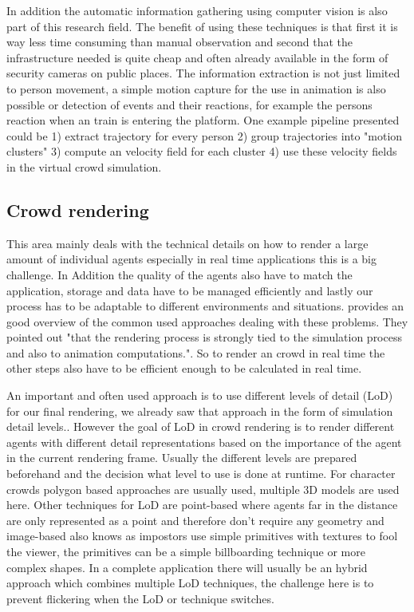 \documentclass{acmsiggraph}               %
\begin{document}
In addition the automatic information gathering using computer vision is also part of this research field. The benefit of using these techniques is that first it is way less time consuming than manual observation and second that the infrastructure needed is quite cheap and often already available in the form of security cameras on public places. The information extraction is not just limited to person movement, a simple motion capture for the use in animation is also possible or detection of events and their reactions, for example the persons reaction when an train is entering the platform. One example pipeline \cite{thalmann_crowd_2013} presented could be 1) extract trajectory for every person 2) group trajectories into "motion clusters" 3) compute an velocity field for each cluster 4) use these velocity fields in the virtual crowd simulation. 

\cite{thalmann_crowd_2013}

\subsection{Crowd rendering}

This area mainly deals with the technical details on how to render a large amount of individual agents especially in real time applications this is a big challenge. In Addition the quality of the agents also have to match the application, storage and data have to be managed  efficiently and lastly our process has to be adaptable to different environments and situations. 
\cite{beacco_survey_2016} provides an good overview of the common used approaches dealing with these problems. They pointed out "that the rendering process is strongly tied to the simulation process and also to animation computations.". So to render an crowd in real time the other steps also have to be efficient enough to be calculated in real time.  

An important and often used approach is to use different levels of detail (LoD) for our final rendering, we already saw that approach in the form of simulation detail levels.\cite{osullivan_levels_2002}. However the goal of LoD in crowd rendering is to render different agents with different detail representations based on the importance of the agent in the current rendering frame. Usually the different levels are prepared beforehand and the decision what level to use is done at runtime. For character crowds polygon based approaches are usually used, multiple 3D models are used here. Other techniques for LoD are point-based where agents far in the distance are only represented as a point and therefore don't require any geometry and image-based also knows as impostors use simple primitives with textures to fool the viewer, the primitives can be a simple billboarding technique or more complex shapes. In a complete application there will usually be an hybrid approach which combines multiple LoD techniques, the challenge here is to prevent flickering when the LoD or technique switches. 
\end{document}
